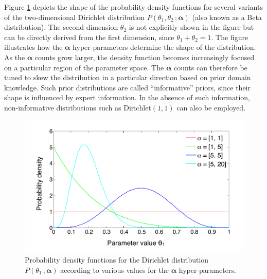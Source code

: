 Figure \ref{fig:dirichletfun} depicts the shape of the probability density functions for several variants of the two-dimensional Dirichlet distribution $P(\theta_1,\theta_2\,; \boldsymbol\alpha)$ (also known as a Beta distribution).  The second dimension $\theta_2$ is not explicitly shown in the figure but can be directly derived from the first dimension, since $\theta_1 + \theta_2=1$.  The figure illustrates how the $\boldsymbol\alpha$ hyper-parameters determine the shape of the distribution. As the $\boldsymbol\alpha$ counts grow larger, the density function becomes increasingly focused on a particular region of the parameter space.  The $\boldsymbol\alpha$ counts can therefore be tuned to skew the distribution in a particular direction based on prior domain knowledge. Such prior distributions are called ``informative'' priors, since their shape is influenced by expert information. In the absence of such information, non-informative distributions such as $\mathrm{Dirichlet}(1,1)$ can also be employed. 
\begin{figure}[ht]
\centering
\includegraphics[scale=0.45]{imgs/dirichletfun.pdf}
\caption{Probability density functions for the Dirichlet distribution $P(\theta_1 \,; \boldsymbol\alpha)$  according to various values for the $\boldsymbol\alpha$ hyper-parameters.}
\label{fig:dirichletfun}
\end{figure}


